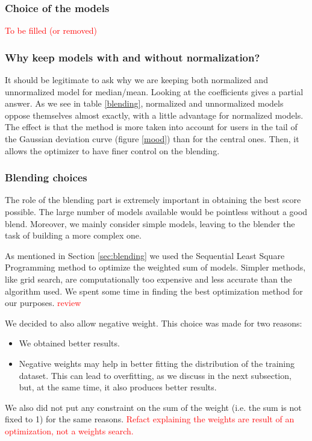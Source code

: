 \documentclass[10pt,conference,compsocconf]{IEEEtran}
\begin{document}
\subsubsection{Choice of the models}

\textcolor{red}{To be filled (or removed)}

\subsubsection{Why keep models with and without normalization?}
\label{with_without_norm}

It should be legitimate to ask why we are keeping both normalized and unnormalized model for
median/mean. Looking at the coefficients gives a partial answer. As we see in table \ref{blending}, normalized and unnormalized models oppose themselves almost exactly, with a little advantage for normalized models. The effect is that the method is more taken into account for users in the tail of the Gaussian deviation curve (figure \ref{mood}) than for the central ones. Then, it allows the optimizer to have finer control on the blending.

\subsubsection{Blending choices}
The role of the blending part is extremely important in obtaining the best score possible. The large
number of models available would be pointless without a good blend. Moreover, we mainly consider
simple models, leaving to the blender the task of building a more complex one.

As mentioned in Section \ref{sec:blending} we used the Sequential Least Square Programming method to
optimize the weighted sum of models. Simpler methods, like grid search, are computationally too
expensive and less accurate than the algorithm used. We spent some time in finding the best
optimization method for our purposes. \textcolor{red}{review}

We decided to also allow negative weight. This choice was made for two reasons:
\begin{itemize}
\item We obtained better results.
\item Negative weights may help in better fitting the distribution of the training dataset. This can
lead to overfitting, as we discuss in the next subsection, but, at the same time, it also produces
better results.
\end{itemize}
We also did not put any constraint on the sum of the weight (i.e. the sum is not fixed  to 1) for the
same reasons.
\textcolor{red}{Refact explaining the weights are result of an optimization, not a weights search.}
\end{document}
